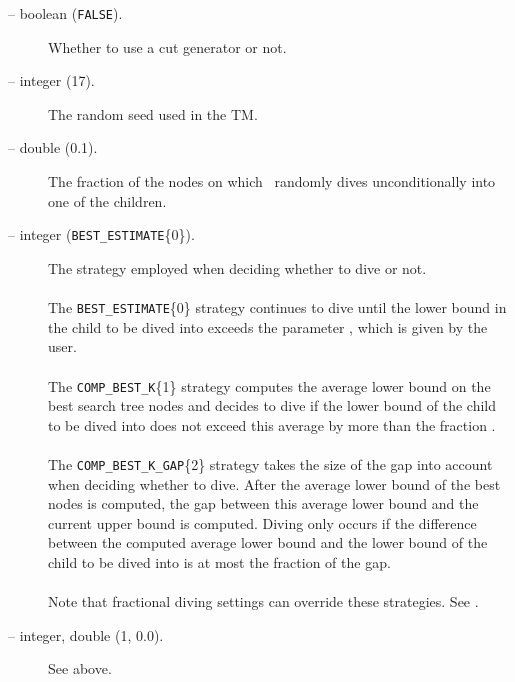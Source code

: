 \begin{description}
\item[ -- boolean ({\tt FALSE}).]
Whether to use a cut generator or not. 

\item[ -- integer (17).] 
The random seed used in the TM.

\item[ -- double (0.1).] 
The fraction of the nodes on which \BB\ randomly dives
unconditionally into one of the children.

\label{diving_strategy}
\item[ -- integer ({\tt BEST\_ESTIMATE}\{0\}).] 
The strategy employed when deciding whether to dive or not. \\
\\
The {\tt BEST\_ESTIMATE}\{0\} strategy continues to dive until the
lower bound in the child to be dived into exceeds the parameter
, which is 
given by the user. \\
\\
The {\tt COMP\_BEST\_K}\{1\} strategy computes the average lower bound
on the best  search tree nodes and
decides to dive if
the lower bound of the child to be dived into does not exceed this
average by more than the fraction .
\\
\\
The {\tt COMP\_BEST\_K\_GAP}\{2\} strategy takes the size of the gap
into account when deciding whether to dive. After the average lower
bound of the best  nodes is computed, 
the gap between
this average lower bound and the current upper bound is computed.
Diving only occurs if the difference between the computed average
lower bound and the lower bound of the child to be dived into is at
most the fraction  of the gap.\\
\\
Note that fractional diving settings can override these strategies.
See .

\label{diving}
\item[ -- integer, double (1, 0.0).] 
See above.


\end{description}
